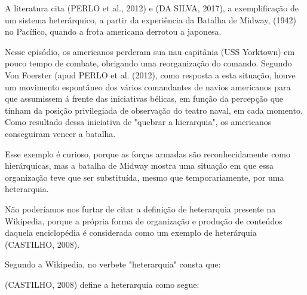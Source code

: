 A literatura cita (PERLO et al., 2012) e (DA SILVA, 2017), a exemplificação de um sistema heterárquico, a partir da experiência da Batalha de Midway, (1942) no Pacífico, quando a frota americana derrotou a japonesa.

Nesse episódio, os americanos perderam sua nau capitânia (USS Yorktown) em pouco tempo de combate, obrigando uma reorganização do comando. Segundo Von Foerster (apud PERLO et al. (2012), como resposta a esta situação, houve um movimento espontâneo dos vários comandantes de navios americanos para que assumissem á frente das iniciativas bélicas, em função da percepção que tinham da posição privilegiada de observação do teatro naval, em cada momento. Como resultado dessa iniciativa de "quebrar a hierarquia", os americanos conseguiram vencer a batalha.

Esse exemplo é curioso, porque as forças armadas são reconhecidamente como hierárquicas, mas a batalha de Midway mostra uma situação em que essa organização teve que ser substituída, mesmo que temporariamente, por uma heterarquia.

Não poderíamos nos furtar de citar a definição de heterarquia presente na Wikipedia, porque a própria forma de organização e produção de conteúdos daquela enciclopédia é considerada como um exemplo de heterárquia  (CASTILHO, 2008).

Segundo a Wikipedia, no verbete "heterarquia" consta que:


\noindent\begin{flushright}\mbox{\linespread{1}\selectfont\centering{}}\end{flushright}


(CASTILHO, 2008) define a heterarquia como segue:


\noindent\begin{flushright}\mbox{\linespread{1}\selectfont\centering{}}\end{flushright}


